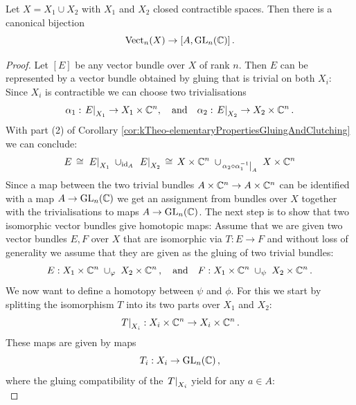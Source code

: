 \begin{lemma}\label{lem:kTheo-gluingAndHomotopyClassesToGLn}
	Let $X=X_1\cup X_2$ with $X_1$ and $X_2$ closed contractible spaces. Then there is a canonical bijection 
	\begin{equation*}
		\operatorname{\mathrm{Vect}}_n(X) \to [A,\mathrm{GL}_n(\mathbb{C})]\,.
	\end{equation*}
\end{lemma}
\begin{proof}
	Let $[E]$ be any vector bundle over $X$ of rank $n$. Then $E$ can be represented by a vector bundle obtained by gluing that is trivial on both $X_i$: Since $X_i$ is contractible we can choose two trivialisations
	\begin{equation*}
		\alpha_1:\left.E\right|_{X_1}\to X_1\times \mathbb{C}^n,\quad \text{and}\quad 	\alpha_2:\left.E\right|_{X_2}\to X_2\times \mathbb{C}^n\,.
	\end{equation*} With part (2) of Corollary \ref{cor:kTheo-elementaryPropertiesGluingAndClutching} we can conclude:
	\begin{equation*}
		E\,\cong\,\left.E\right|_{X_1}\;\cup_{\operatorname{\mathrm{id}}_A} \; \left.E\right|_{X_2}\, \cong\, 
		X\times \mathbb{C}^n \;\cup_{\left.\alpha_2\circ \alpha_1^{-1}\right|_{A}} \; X\times \mathbb{C}^n
	\end{equation*} Since a map between the two trivial bundles $A\times \mathbb{C}^n\to A\times \mathbb{C}^n$ can be identified with a map $A\to \mathrm{GL}_n(\mathbb{C})$ we get an assignment from bundles over $X$ together with the trivialisations to maps $A\to \mathrm{GL}_n(\mathbb{C})$. The next step is to show that two isomorphic vector bundles give homotopic maps: Assume that we are given two vector bundles $E,F$ over $X$ that are isomorphic via $T:E\to F$ and without loss of generality we assume that they are given as the gluing of two trivial bundles: 
	\begin{equation*}
		E: X_1\times \mathbb{C}^n \;\cup_{\varphi} \; X_2\times \mathbb{C}^n\,,\quad\text{and}\quad  
		F: X_1\times \mathbb{C}^n \;\cup_{\psi} \; X_2\times \mathbb{C}^n\,.
	\end{equation*}
	We now want to define a homotopy between $\psi$ and $\phi$. For this we start by splitting the isomorphism $T$ into its two parts over $X_1$ and $X_2$:
	\begin{equation*}
		\left.T\right|_{X_i}: X_i\times \mathbb{C}^n \to X_i\times \mathbb{C}^n\,.
	\end{equation*} These maps are given by maps 
	\begin{equation*}
		T_i: X_i\to \mathrm{GL}_n(\mathbb{C})\,,
	\end{equation*} where the gluing compatibility of the $\left.T\right|_{X_i}$ yield for any $a\in A$:
	\begin{equation*}

\end{equation*}
\end{proof}
